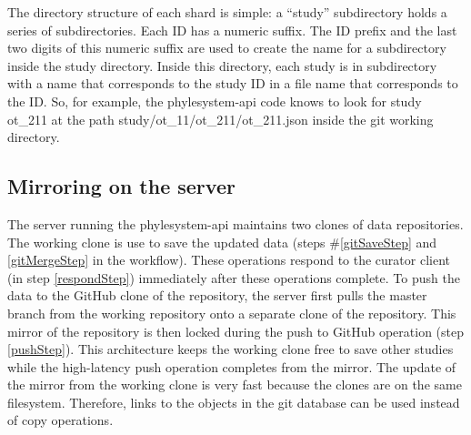 \documentclass{bioinfo}
\newcommand{\ps}{phylesystem\xspace}
\begin{document}
\begin{methods}
The directory structure of each shard is simple: a ``study'' subdirectory holds 
a series of subdirectories.
Each ID has a numeric suffix.
The ID prefix and the last two digits of this numeric suffix are used to create the name
    for a subdirectory inside the study directory.
Inside this directory, each study is in subdirectory with a name that corresponds to the study ID
    in a file name that corresponds to the ID.
So, for example, the \ps-api code knows to look for study ot\_211 at the path
    study/ot\_11/ot\_211/ot\_211.json inside the git working directory.

\subsection*{Mirroring on the server}
The server running the \ps-api maintains two clones of data repositories.
The working clone is use to save the updated data (steps \#\ref{gitSaveStep} and \ref{gitMergeStep}  in the workflow).
These operations respond to the curator client (in step \ref{respondStep}) immediately
    after these operations complete.
To push the data to the GitHub clone of the repository, the server first pulls the master branch from the working repository onto a separate
    clone of the repository.
This mirror of the repository is then locked during the push to GitHub operation (step \ref{pushStep}).
This architecture keeps the working clone free to save other studies while the high-latency push operation completes from the mirror.
The update of the mirror from the working clone is very fast because the clones are on the same filesystem.
Therefore, links to the objects in the git database can be used instead of copy operations.


\end{methods}
\end{document}
